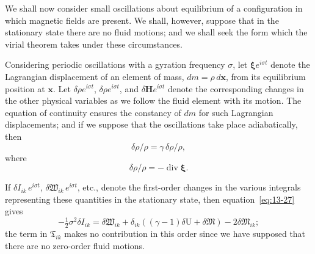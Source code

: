 We shall now consider small oscillations about equilibrium of a configuration in which magnetic fields are present. We shall, however, suppose that in the stationary state there are no fluid motions; and we shall seek the form which the virial theorem takes under these circumstances.

Considering periodic oscillations with a gyration frequency $\sigma$, let $\boldsymbol{\xi}e^{i\sigma t}$ denote the Lagrangian displacement of an element of mass, $dm = \rho\,d\mathbf{x}$, from its equilibrium position at $\mathbf{x}$. Let $\delta\rho e^{i\sigma t}$, $\delta\rho e^{i\sigma t}$, and $\delta\mathbf{H}e^{i\sigma t}$ denote the corresponding changes in the other physical variables as we follow the fluid element with its motion. The equation of continuity ensures the constancy of $dm$ for such Lagrangian displacements; and if we suppose that the oscillations take place adiabatically, then
\begin{equation}
\label{eq:13-44}
\delta\rho/\rho = \gamma\,\delta\rho/\rho,
\end{equation}
where
\begin{equation}
\label{eq:13-45}
\delta\rho/\rho = -\operatorname{div}\boldsymbol{\xi}.
\end{equation}

If $\delta I_{ik}\,e^{i\sigma t}$, $\delta\mathfrak{W}_{ik}\,e^{i\sigma t}$, etc., denote the first-order changes in the various integrals representing these quantities in the stationary state, then equation~\eqref{eq:13-27} gives
\begin{equation}
\label{eq:13-46}
-\tfrac{1}{2}\sigma^2 \delta I_{ik} = \delta\mathfrak{W}_{ik} + \delta_{ik}((\gamma-1)\delta\mathrm{U}+\delta\mathfrak{M}) - 2\delta\mathfrak{M}_{ik};
\end{equation}
the term in $\mathfrak{T}_{ik}$ makes no contribution in this order since we have supposed that there are no zero-order fluid motions.

